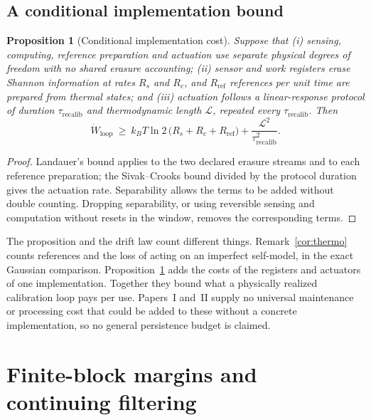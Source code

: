 \documentclass[12pt]{article}
\newtheorem{proposition}[theorem]{Proposition}
\theoremstyle{definition}
\begin{document}
\subsection{A conditional implementation bound}
\label{subsec:cost_theorem}

\begin{proposition}[Conditional implementation cost]
\label{prop:loop_cost_impl}
Suppose that (i) sensing, computing, reference preparation and actuation use separate physical degrees of freedom with no shared erasure accounting; (ii) sensor and work registers erase Shannon information at rates $R_s$ and $R_c$, and $R_{\mathrm{ref}}$ references per unit time are prepared from thermal states; and (iii) actuation follows a linear-response protocol of duration $\tau_{\mathrm{recalib}}$ and thermodynamic length $\mathcal L$, repeated every $\tau_{\mathrm{recalib}}$. Then
\begin{equation}
\label{eq:loop_cost}
\dot W_{\mathrm{loop}}\ \ge\ k_BT\ln2\,\bigl(R_s+R_c+R_{\mathrm{ref}}\bigr)+\frac{\mathcal L^2}{\tau_{\mathrm{recalib}}^2}.
\end{equation}
\end{proposition}

\begin{proof}
Landauer's bound applies to the two declared erasure streams and to each reference preparation; the Sivak--Crooks bound divided by the protocol duration gives the actuation rate. Separability allows the terms to be added without double counting. Dropping separability, or using reversible sensing and computation without resets in the window, removes the corresponding terms.
\end{proof}

The proposition and the drift law count different things. Remark~\ref{cor:thermo} counts references and the loss of acting on an imperfect self-model, in the exact Gaussian comparison. Proposition~\ref{prop:loop_cost_impl} adds the costs of the registers and actuators of one implementation. Together they bound what a physically realized calibration loop pays per use. Papers~I and~II supply no universal maintenance or processing cost that could be added to these without a concrete implementation, so no general persistence budget is claimed.


\section{Finite-block margins and continuing filtering}
\end{document}
